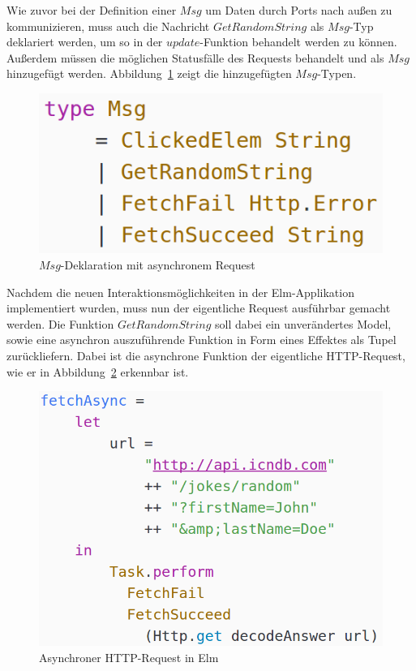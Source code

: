 Wie zuvor bei der Definition einer $Msg$ um Daten durch Ports nach außen zu kommunizieren, muss auch die Nachricht $GetRandomString$ als $Msg$-Typ deklariert werden, um so in der $update$-Funktion behandelt werden zu können. Außerdem müssen die möglichen Statusfälle des Requests behandelt und als $Msg$ hinzugefügt werden. Abbildung~\ref{fig:msg-async} zeigt die hinzugefügten $Msg$-Typen.
\begin{figure}[h]
\centering
\includegraphics[scale=0.5]{img/msg-async.png}
\caption{$Msg$-Deklaration mit asynchronem Request}\label{fig:msg-async}
\end{figure}
Nachdem die neuen Interaktionsmöglichkeiten in der Elm-Applikation implementiert wurden, muss nun der eigentliche Request ausführbar gemacht werden. Die Funktion $GetRandomString$ soll dabei ein unverändertes Model, sowie eine asynchron auszuführende Funktion in Form eines Effektes als Tupel zurückliefern. Dabei ist die asynchrone Funktion der eigentliche \ac{HTTP}-Request, wie er in Abbildung~\ref{fig:fetchasync-async} erkennbar ist.
\begin{figure}[h]
\centering
\includegraphics[scale=0.3]{img/fetchasync-async.png}
\caption{Asynchroner \ac{HTTP}-Request in Elm}\label{fig:fetchasync-async}
\end{figure}
